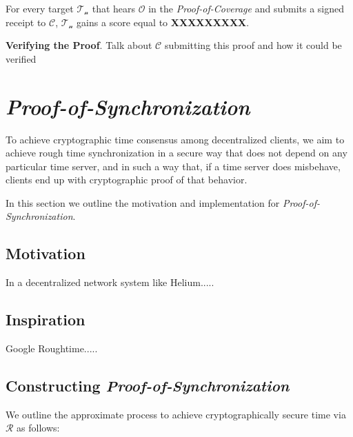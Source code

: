 \documentclass[letterpaper,11pt]{article}
\def\proofofcoverage/{\textit{Proof-of-Coverage}}
\begin{document}
For every target $\mathcal{T_n}$ that hears $\mathcal{O}$ in the \proofofcoverage/ and submits a signed receipt to $\mathcal{C}$, $\mathcal{T_n}$ gains a score equal to \textbf{XXXXXXXXX}.\newline

\textbf{Verifying the Proof}. Talk about $\mathcal{C}$ submitting this proof and how it could be verified\newline

\newpage

\section{\textit{Proof-of-Synchronization}} \label{roughtime}

To achieve cryptographic time consensus among decentralized clients, we aim to achieve rough time synchronization in a secure way that does not depend on any particular time server, and in such a way that, if a time server does misbehave, clients end up with cryptographic proof of that behavior. \newline

In this section we outline the motivation and implementation for \textit{Proof-of-Synchronization}.

\subsection{Motivation}

In a decentralized network system like Helium.....

\subsection{Inspiration}

Google Roughtime.....

\subsection{Constructing \textit{Proof-of-Synchronization}}

We outline the approximate process to achieve cryptographically secure time via $\mathcal{R}$ as follows:\newline
\end{document}

